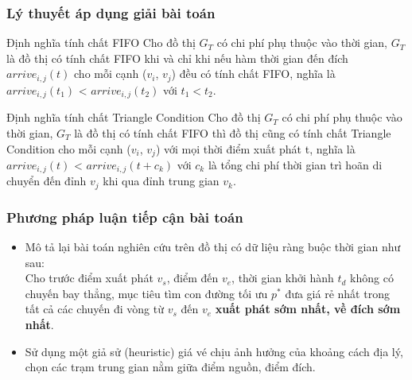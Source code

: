 \documentclass[t]{beamer}
\begin{document}
\begin{frame}
\frametitle{Lý thuyết áp dụng giải bài toán}
\begin{block}{Định nghĩa tính chất FIFO}
Cho đồ thị $G_{T}$ có chi phí phụ thuộc vào thời gian, $G_{T}$ là đồ thị có tính chất FIFO khi và chỉ khi nếu hàm thời gian đến đích $arrive _{i,j}(t)$ cho mỗi cạnh ($v_{i}$, $v_{j}$) đều có tính chất FIFO, nghĩa là $arrive_{i,j}(t_{1})$ < $arrive_{i,j}(t_{2})$ với $t_{1} < t_{2}$.\\    
\end{block}
\begin{block}{Định nghĩa tính chất Triangle Condition}
Cho đồ thị $G_{T}$ có chi phí phụ thuộc vào thời gian, $G_{T}$ là đồ thị có tính chất FIFO thì đồ thị cũng có tính chất Triangle Condition cho mỗi cạnh ($v_{i}$, $v_{j}$) với mọi thời điểm xuất phát t, nghĩa là $arrive_{i,j}(t)$ < $arrive_{i,j}(t+c_{k})$ với $c_{k}$ là tổng chi phí thời gian trì hoãn di chuyển đến đỉnh $v_{j}$ khi qua đỉnh trung gian $v_{k}$.\\    
\end{block}
\end{frame}


\begin{frame}
\frametitle{Phương pháp luận tiếp cận bài toán}
\begin{itemize}
\item Mô tả lại bài toán nghiên cứu trên đồ thị có dữ liệu ràng buộc thời gian như sau:\\
Cho trước điểm xuất phát $v_{s}$, điểm đến $v_{e}$, thời gian khởi hành $t_{d}$ không có chuyến bay thẳng, mục tiêu tìm con đường tối ưu $p^*$ đưa giá rẻ nhất trong tất cả các chuyến đi vòng từ $v_{s}$ đến $v_{e}$ \textbf{xuất phát sớm nhất, về đích sớm nhất}.
\item Sử dụng một giả sử (heuristic) giá vé chịu ảnh hưởng của khoảng cách địa lý, chọn các trạm trung gian nằm giữa điểm nguồn, điểm đích.
\end{itemize}
\end{frame}
\end{document}
